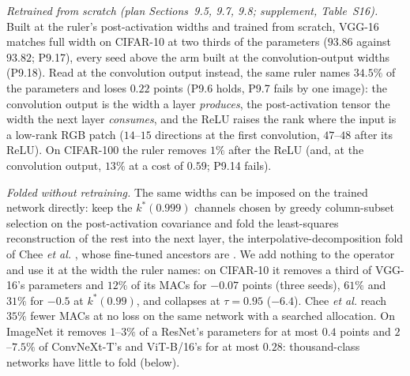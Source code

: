 \documentclass[10pt,journal,compsoc]{IEEEtran}
\begin{document}
\begin{table}[t]
  \caption{One width, three uses: VGG-16 (BN) and ResNet-20 on CIFAR-10 under the recipe of Section~\ref{sec:repro-garg}. MACs and parameters as fractions of the full network; \emph{training} in units of one full-width training (the MACs fraction in force at each epoch, averaged; a retrained arm counts the full training it was read from); accuracy mean $\pm$ SD over $n$ seeds at epoch 100. Fold: the ruler's widths cut by column-subset selection and folded into the next layer, no retraining. Controller: grow on unmet-variance directions after epoch 15, shrink by column-subset selection after epochs 15 and 40, water-filled under the MACs budget.}
  \label{tab:ctrl}
  \centering
  \scriptsize
  \setlength{\tabcolsep}{3pt}
  
\end{table}

\emph{Retrained from scratch (plan Sections~9.5, 9.7, 9.8; supplement, Table~S16).}
Built at the ruler's post-activation widths and trained from scratch,
VGG-16 matches full width on CIFAR-10 at two thirds of the parameters
($93.86$ against $93.82$; P9.17), every seed above the arm built at the
convolution-output widths (P9.18). Read at the convolution output instead, the
same ruler names $34.5\%$ of the parameters and loses $0.22$ points (P9.6
holds, P9.7 fails by one image): the convolution output is the width a
layer \emph{produces}, the post-activation tensor the width the next
layer \emph{consumes}, and the ReLU raises the rank where the input is a
low-rank RGB patch ($14$--$15$ directions at the first convolution, $47$--$48$
after its ReLU). On CIFAR-100 the ruler removes $1\%$ after the ReLU
(and, at the convolution output, $13\%$ at a cost of $0.59$; P9.14 fails).


\emph{Folded without retraining.} The same widths can be imposed on the
trained network directly: keep the $k^*(0.999)$ channels chosen by greedy
column-subset selection on the post-activation covariance and fold the
least-squares reconstruction of the rest into the next layer, the
interpolative-decomposition fold of Chee \emph{et al.}
\cite{chee2022id}, whose fine-tuned ancestors are
\cite{he2017channel,luo2017thinet}. We add nothing to the operator and use
it at the width the ruler names: on CIFAR-10 it removes a
third of VGG-16's parameters and $12\%$ of its MACs for $-0.07$ points
(three seeds), $61\%$ and $31\%$ for $-0.5$ at $k^*(0.99)$, and collapses
at $\tau = 0.95$ ($-6.4$). Chee \emph{et al.} reach $35\%$ fewer MACs at no
loss on the same network with a searched allocation. On ImageNet it removes $1$--$3\%$ of a ResNet's parameters for at most
$0.4$ points and $2$--$7.5\%$ of ConvNeXt-T's and ViT-B/16's for at most
$0.28$: thousand-class networks have little to fold (below).
\end{document}
